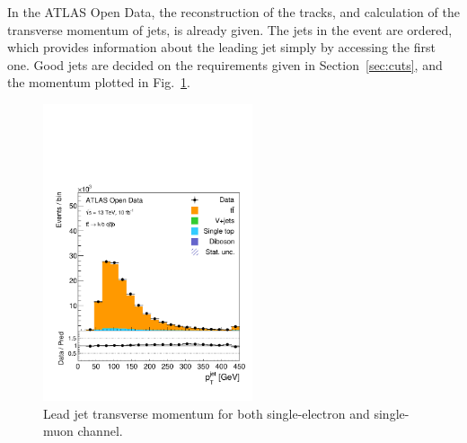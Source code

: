 \documentclass[12pt,a4paper]{article}
\numberwithin{equation}{section}
\begin{document}
In the ATLAS Open Data, the reconstruction of the tracks, and calculation of the
transverse momentum of jets, is already given. The jets in the event are
ordered, which provides information about the leading jet simply by accessing
the first one. Good jets are decided on the requirements given in
Section~\ref{sec:cuts}, and the momentum plotted in
Fig.~\ref{fig:jetpt}. %
\begin{figure}[H]
  \centering
  \includegraphics[width=0.55\textwidth]{figures/hist_leadjet_pt}
  \caption{\label{fig:jetpt}Lead jet transverse momentum for both single-electron and single-muon channel.}
\end{figure}
\end{document}
